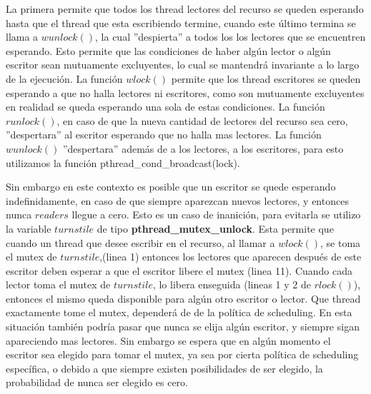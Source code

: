 La primera permite que todos los thread lectores del recurso se queden esperando hasta que el thread que esta escribiendo termine, cuando este último termina se llama a $ wunlock() $, la cual ''despierta'' a todos los los lectores que se encuentren esperando. Esto permite que las condiciones de haber algún lector o algún escritor sean mutuamente excluyentes, lo cual se mantendrá invariante a lo largo de la ejecución. La función $ wlock() $ permite que los thread escritores se queden esperando a que no halla lectores ni escritores, como son mutuamente excluyentes en realidad se queda esperando una sola de estas condiciones. La función $ runlock() $, en caso de que la nueva cantidad de lectores del recurso sea cero, ''despertara'' al escritor esperando que no halla mas lectores. La función $ wunlock() $ ''despertara'' además de a los lectores, a los escritores, para esto utilizamos la función pthread_cond_broadcast(lock).

Sin embargo en este contexto es posible que un escritor se quede esperando indefinidamente, en caso de que siempre aparezcan nuevos lectores, y entonces nunca $ readers $ llegue a cero. Esto es un caso de inanición, para evitarla se utilizo la variable $ turnstile $ de tipo \textbf{pthread_mutex_unlock}. Esta permite que cuando un thread que desee escribir en el recurso, al llamar a $ wlock() $, se toma el mutex de $ turnstile $,(linea 1) entonces los lectores que aparecen después de este escritor deben esperar a que el escritor libere el mutex (linea 11). Cuando cada lector toma el mutex de $ turnstile $, lo libera enseguida (lineas 1 y 2 de $ rlock() $), entonces el mismo queda disponible para algún otro escritor o lector. Que thread exactamente tome el mutex, dependerá de de la política de scheduling. En esta situación también podría pasar que nunca se elija algún escritor, y siempre sigan apareciendo mas lectores. Sin embargo se espera que en algún momento el escritor sea elegido para tomar el mutex, ya sea por cierta política de scheduling específica, o debido a que siempre existen posibilidades de ser elegido, la probabilidad de nunca ser elegido es cero.
